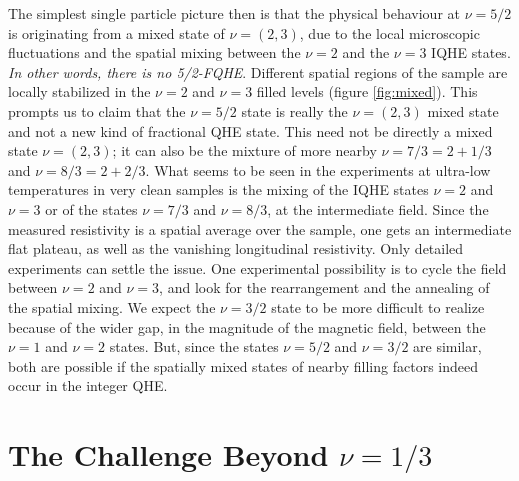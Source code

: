 \documentclass[aps,preprint,12pt,tightenlines]{revtex4}%
\begin{document}
The simplest single particle picture then is that the physical behaviour at
$\nu=5/2$ is originating from a mixed state of $\nu=(2,3)$, due to the local
microscopic fluctuations and the spatial mixing between the $\nu=2$ and the
$\nu=3$ IQHE states.\emph{ In other words, there is no 5/2-FQHE}. Different
spatial regions of the sample are locally stabilized in the $\nu=2$ and
$\nu=3$ filled levels (figure \ref{fig:mixed}). This prompts us to claim that the
$\nu=5/2$ state is really the $\nu=(2,3)$ mixed state and not a new kind of
fractional QHE state. This need not be directly a mixed state $\nu=(2,3)$; it
can also be the mixture of more nearby $\nu=7/3=2+1/3$ and $\nu=8/3=2+2/3$.
What seems to be seen in the experiments at ultra-low temperatures in very
clean samples is the mixing of the IQHE states $\nu=2$ and $\nu=3$ or of the
states $\nu=7/3$ and $\nu=8/3$, at the intermediate field. Since the measured
resistivity is a spatial average over the sample, one gets an intermediate
flat plateau, as well as the vanishing longitudinal resistivity. Only detailed
experiments can settle the issue. One experimental possibility is to cycle the
field between $\nu=2$ and $\nu=3$, and look for the rearrangement and the
annealing of the spatial mixing. We expect the $\nu=3/2$ state to be more
difficult to realize because of the wider gap, in the magnitude of the
magnetic field, between the $\nu=1$ and $\nu=2$ states. But, since the states
$\nu=5/2$ and $\nu=3/2$ are similar, both are possible if the spatially mixed
states of nearby filling factors indeed occur in the integer QHE.

\section{The Challenge Beyond $\nu=1/3$}
\end{document}
